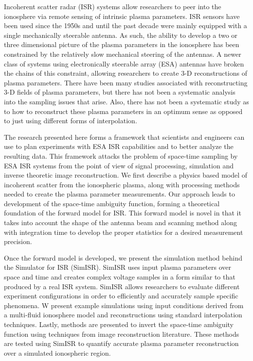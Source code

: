 
Incoherent scatter radar (ISR) systems allow researchers to peer into the ionosphere via remote sensing of intrinsic plasma parameters. ISR sensors have been used since the 1950s and until the past decade were mainly equipped with a single mechanically steerable antenna. As such, the ability to develop a two or three dimensional picture of the plasma parameters in the ionosphere has been constrained by the relatively slow mechanical steering of the antennas. A newer class of systems using electronically steerable array (ESA) antennas have broken the chains of this constraint, allowing researchers to create 3-D reconstructions of plasma parameters. There have been many studies associated with reconstructing 3-D fields of plasma parameters, but there has not been a systematic analysis into the sampling issues that arise. Also, there has not been a systematic study as to how to reconstruct these plasma parameters in an optimum sense as opposed to just using different forms of interpolation.

The research presented here forms a framework that scientists and engineers can use to plan experiments with ESA ISR capabilities and to better analyze the resulting data. This framework attacks the problem of space-time sampling by ESA ISR systems from the point of view of signal processing, simulation and inverse theoretic image reconstruction. We first describe a physics based model of incoherent scatter from the ionospheric plasma, along with processing methods needed to create the plasma parameter measurements. Our approach leads to development of the space-time ambiguity function, forming a theoretical foundation of the forward model for ISR. This forward model is novel in that it takes into account the shape of the antenna beam and scanning method along with integration time to develop the proper statistics for a desired measurement precision.

Once the forward model is developed, we present the simulation method behind the Simulator for ISR (SimISR). SimISR uses input plasma parameters over space and time and creates complex voltage samples in a form similar to that produced by a real ISR system. SimISR allows researchers to evaluate different experiment configurations in order to efficiently and accurately sample specific phenomena. W present example simulations using input conditions derived from a multi-fluid ionosphere model and reconstructions using standard interpolation techniques. Lastly, methods are presented to invert the space-time ambiguity function using techniques from image reconstruction literature. These methods are tested using SimISR to quantify accurate plasma parameter reconstruction over a simulated ionospheric region.
